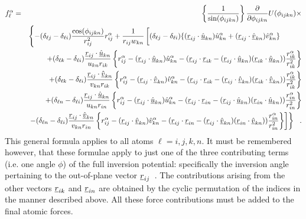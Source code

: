 \begin{eqnarray}
f_{\ell}^{\alpha} &=&
\left\{\frac{1}{\sin(\phi_{ijkn})}\right\}
\frac{\partial}{\partial \phi_{ijkn}}U(\phi_{ijkn})\times \\
& &
\left\{-(\delta_{\ell j}-\delta_{\ell i})\frac{\cos(\phi_{ijkn})}
{r_{ij}^{2}}r_{ij}^{\alpha} +\frac{1}{r_{ij}w_{kn}}\left [
(\delta_{\ell j}-\delta_{\ell i})
\{(\vek{r}_{ij}\cdot\vek{\hat{u}}_{kn})\hat{u}_{kn}^{\alpha}+
(\vek{r}_{ij}\cdot\vek{\hat{v}}_{kn})\hat{v}_{kn}^{\alpha}\}
\phantom{\left\{\frac{a_{a}^{a}}{a_{a}^{a}}\right\}}
\right. \right. \nonumber \\
& & + (\delta_{\ell k}-\delta_{\ell i})
\frac{\vek{r}_{ij}\cdot\vek{\hat{u}}_{kn}}{u_{kn}r_{ik}}\left \{
r_{ij}^{\alpha}-(\vek{r}_{ij}\cdot\vek{\hat{u}}_{kn})\hat{u}_{kn}^{\alpha}
-(\vek{r}_{ij}\cdot\vek{r}_{ik}-(\vek{r}_{ij}\cdot\vek{\hat{u}}_{kn})
(\vek{r}_{ik}\cdot\vek{\hat{u}}_{kn}))\frac{r_{ik}^{\alpha}}{r_{ik}^{2}}
\right \} \nonumber \\
& & + (\delta_{\ell k}-\delta_{\ell i})
\frac{\vek{r}_{ij}\cdot\vek{\hat{v}}_{kn}}{v_{kn}r_{ik}}\left \{
r_{ij}^{\alpha}-(\vek{r}_{ij}\cdot\vek{\hat{v}}_{kn})\hat{v}_{kn}^{\alpha}
-(\vek{r}_{ij}\cdot\vek{r}_{ik}-(\vek{r}_{ij}\cdot\vek{\hat{v}}_{kn})
(\vek{r}_{ik}\cdot\vek{\hat{v}}_{kn}))\frac{r_{ik}^{\alpha}}{r_{ik}^{2}}
\right \} \nonumber \\
& &+ (\delta_{\ell n}-\delta_{\ell i})
\frac{\vek{r}_{ij}\cdot\vek{\hat{u}}_{kn}}{u_{kn}r_{in}}\left \{
r_{ij}^{\alpha}-(\vek{r}_{ij}\cdot\vek{\hat{u}}_{kn})\hat{u}_{kn}^{\alpha}
-(\vek{r}_{ij}\cdot\vek{r}_{in}-(\vek{r}_{ij}\cdot\vek{\hat{u}}_{kn})
(\vek{r}_{in}\cdot\vek{\hat{u}}_{kn}))\frac{r_{in}^{\alpha}}{r_{in}^{2}}
\right \} \nonumber \\
& & \left . \left .- (\delta_{\ell n}-\delta_{\ell i})
\frac{\vek{r}_{ij}\cdot\vek{\hat{v}}_{kn}}{v_{kn}r_{in}}\left \{
r_{ij}^{\alpha}-(\vek{r}_{ij}\cdot\vek{\hat{v}}_{kn})\hat{v}_{kn}^{\alpha}
-(\vek{r}_{ij}\cdot\vek{r}_{in}-(\vek{r}_{ij}\cdot\vek{\hat{v}}_{kn})
(\vek{r}_{in}\cdot\vek{\hat{v}}_{kn}))\frac{r_{in}^{\alpha}}{r_{in}^{2}}
\right \} \right ] \right \}~~. \nonumber
\end{eqnarray}
This general formula applies to all atoms $\ell=i,j,k,n$.  It must
be remembered however, that these formulae apply to just one of
the three contributing terms (i.e. one angle $\phi$) of the full
inversion potential: specifically the
inversion angle pertaining to the
out-of-plane vector $\mbox{$\underline{r}$}_{ij}$~.  The contributions arising
from the other vectors $\mbox{$\underline{r}$}_{ik}$ and $\mbox{$\underline{r}$}_{in}$ are
obtained by the cyclic permutation of the indices in the manner
described above.  All these force contributions must be added to
the final atomic forces.

